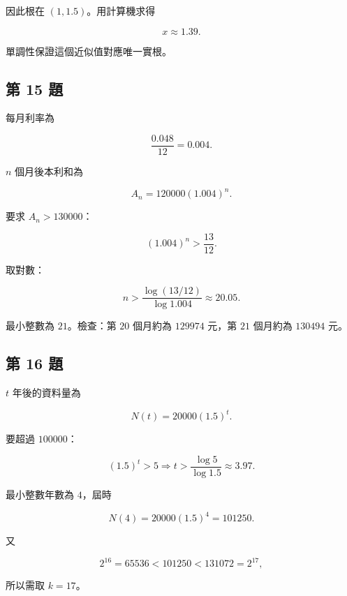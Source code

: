 \documentclass[11pt,a4paper]{article}
\begin{document}
因此根在 \((1,1.5)\)。用計算機求得

\[
\boxed{x\approx1.39}.
\]

單調性保證這個近似值對應唯一實根。

\subsection{第 15 題}\label{ux7b2c-15-ux984c}

每月利率為

\[
\frac{0.048}{12}=0.004.
\]

\(n\) 個月後本利和為

\[
\boxed{A_n=120000(1.004)^n}.
\]

要求 \(A_n>130000\)：

\[
(1.004)^n>\frac{13}{12}.
\]

取對數：

\[
n>\frac{\log(13/12)}{\log1.004}
\approx20.05.
\]

最小整數為 \(\boxed{21}\)。檢查：第 \(20\) 個月約為 \(129974\) 元，第 \(21\) 個月約為 \(130494\) 元。

\subsection{第 16 題}\label{ux7b2c-16-ux984c}

\(t\) 年後的資料量為

\[
\boxed{N(t)=20000(1.5)^t}.
\]

要超過 \(100000\)：

\[
(1.5)^t>5
\Longrightarrow
t>\frac{\log5}{\log1.5}
\approx3.97.
\]

最小整數年數為 \(\boxed{4}\)，屆時

\[
N(4)=20000(1.5)^4=101250.
\]

又

\[
2^{16}=65536<101250<131072=2^{17},
\]

所以需取 \(\boxed{k=17}\)。
\end{document}
